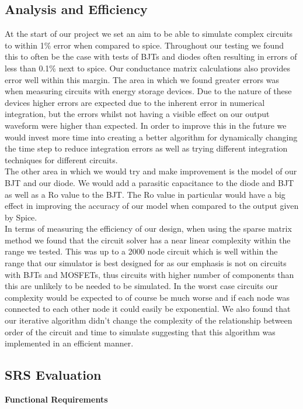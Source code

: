 \documentclass{article}
\begin{document}
\subsection{Analysis and Efficiency }
At the start of our project we set an aim to be able to simulate complex circuits to within 1\% error when compared to spice. Throughout our testing we found this to often be the case with tests of BJTs and diodes often resulting in errors of less than 0.1\% next to spice. Our conductance matrix calculations also provides error well within this margin. The area in which we found greater errors was when measuring circuits with energy storage devices. Due to the nature of these devices higher errors are expected due to the inherent error in numerical integration, but the errors whilst not having a visible effect on our output waveform were higher than expected. In order to improve this in the future we would invest more time into creating a better algorithm for dynamically changing the time step to reduce integration errors as well as trying different integration techniques for different circuits. \\The other area in which we would try and make improvement is the model of our BJT and our diode. We would add a parasitic capacitance to the diode and BJT as well as a Ro value to the BJT. The Ro value in particular would have a big effect in improving the accuracy of our model when compared to the output given by Spice. \\In terms of measuring the efficiency of our design, when using the sparse matrix method we found that the circuit solver has a near linear complexity within the range we tested. This was up to a 2000 node circuit which is well within the range that our simulator is best designed for as our emphasis is not on circuits with BJTs and MOSFETs, thus circuits with higher number of components than this are unlikely to be needed to be simulated. In the worst case circuits our complexity would be expected to of course be much worse and if each node was connected to each other node it could easily be exponential. We also found that our iterative algorithm didn't change the complexity of the relationship between order of the circuit and time to simulate suggesting that this algorithm was implemented in an efficient manner. 
\newpage
\subsection{SRS Evaluation}

\textbf{Functional Requirements}
\end{document}
